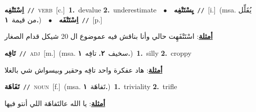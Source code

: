 \documentclass[10pt,a4paper,twoside]{article} %
\begin{document}
\begin{multicols}{2}
{{{{{{{{{{{{\setlength\topsep{0pt}\textbf{\foreignlanguage{arabic}{اِسْتَتْفِه}}\ {\color{gray}\texttt{//}\color{black}}\ \textsc{verb}\ [c.]\ \textbf{1.}~devalue  \textbf{2.}~underestimate\ \ $\bullet$\ \ \setlength\topsep{0pt}\textbf{\foreignlanguage{arabic}{يِسْتَتْفِه}}\ {\color{gray}\texttt{//}\color{black}}\ [i.]\ \color{gray}(msa. \foreignlanguage{arabic}{يُقَلِّل من قيمة}~\foreignlanguage{arabic}{\textbf{١.}})\color{black}\ \ $\bullet$\ \ \setlength\topsep{0pt}\textbf{\foreignlanguage{arabic}{اِسْتَتْفَه}}\ {\color{gray}\texttt{//}\color{black}}\ [p.]\  \begin{flushright}\color{gray}\foreignlanguage{arabic}{\textbf{\underline{\foreignlanguage{arabic}{أمثلة}}}: اسْتَتْفَهِت حالي وأنا بناقش فيه عموضوع ال 20 شيكل قدام الصغار}\end{flushright}\color{black}} \vspace{2mm}

{\setlength\topsep{0pt}\textbf{\foreignlanguage{arabic}{تَافِه}}\ {\color{gray}\texttt{//}\color{black}}\ \textsc{adj}\ [m.]\ \color{gray}(msa. \foreignlanguage{arabic}{سخيف}~\foreignlanguage{arabic}{\textbf{٢.}}  \foreignlanguage{arabic}{تافِه}~\foreignlanguage{arabic}{\textbf{١.}})\color{black}\ \textbf{1.}~silly  \textbf{2.}~croppy\  \begin{flushright}\color{gray}\foreignlanguage{arabic}{\textbf{\underline{\foreignlanguage{arabic}{أمثلة}}}: هاد عفكرة واحد تافِه وحقير وبيسواش شي بالغلا}\end{flushright}\color{black}} \vspace{2mm}

{\setlength\topsep{0pt}\textbf{\foreignlanguage{arabic}{تَفَاهَة}}\ {\color{gray}\texttt{//}\color{black}}\ \textsc{noun}\ [f.]\ \color{gray}(msa. \foreignlanguage{arabic}{تَفاهَة}~\foreignlanguage{arabic}{\textbf{١.}})\color{black}\ \textbf{1.}~triviality  \textbf{2.}~trifle\  \begin{flushright}\color{gray}\foreignlanguage{arabic}{\textbf{\underline{\foreignlanguage{arabic}{أمثلة}}}: يا الله عالتَفاهَة اللي أنتو فيها}\end{flushright}\color{black}} \vspace{2mm}

}}}}}}}}}}}
\end{multicols}
\end{document}
